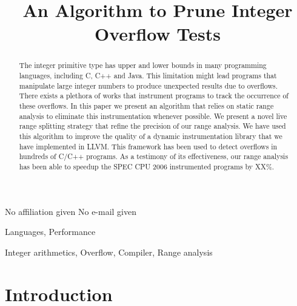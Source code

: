 \documentclass[preprint]{sigplanconf}[10pt]
\begin{document}
\copyrightdata{[to be supplied]} 


\title{An Algorithm to Prune Integer Overflow Tests}

           {No affiliation given}
           {No e-mail given}

\maketitle

\begin{abstract}
The integer primitive type has upper and lower bounds in many programming
languages, including C, C++ and Java.
This limitation might lead programs that manipulate large integer numbers to
produce unexpected results due to overflows.
There exists a plethora of works that instrument programs to track the occurrence
of these overflows.
In this paper we present an algorithm that relies on static range analysis to
eliminate this instrumentation whenever possible.
We present a novel live range splitting strategy that refine the precision of
our range analysis.
We have used this algorithm to improve the quality of a dynamic instrumentation
library that we have implemented in LLVM.
This framework has been used to detect overflows in hundreds of C/C++ programs.
As a testimony of its effectiveness, our range analysis has been able to speedup
the SPEC CPU 2006 instrumented programs by XX\%.
\end{abstract}


\terms
Languages, Performance

\keywords
Integer arithmetics, Overflow, Compiler, Range analysis

\section{Introduction}
\label{sec:int}
\end{document}
